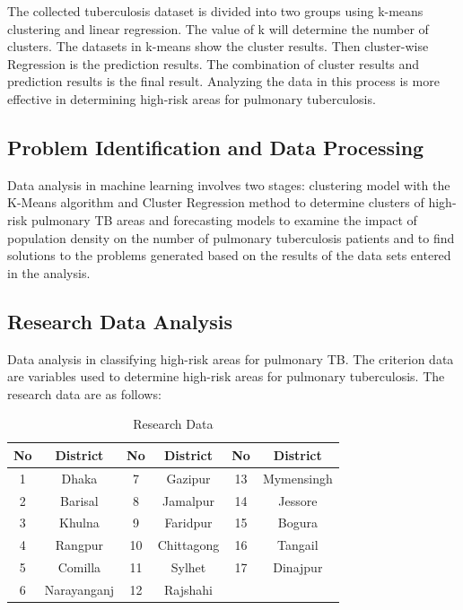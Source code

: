 \documentclass[conference]{IEEEtran}
\begin{document}
The collected tuberculosis dataset is divided into two groups using k-means clustering and linear regression.  The value of k will determine the number of clusters. The datasets in k-means show the cluster results.  Then cluster-wise Regression is the prediction results.  The combination of cluster results and prediction results is the final result.  Analyzing the data in this process is more effective in determining high-risk areas for pulmonary tuberculosis.

\subsection{Problem Identification and Data Processing}
Data analysis in machine learning involves two stages: clustering model with the K-Means algorithm and Cluster Regression method to determine clusters of high-risk pulmonary TB areas and forecasting models to examine the impact of population density on the number of pulmonary tuberculosis patients and to find solutions to the problems generated based on the results of the data sets entered in the analysis.

\subsection{Research Data Analysis}
Data analysis in classifying high-risk areas for pulmonary TB. The criterion data are variables used to determine high-risk areas for pulmonary tuberculosis. The research data are as follows:

\begin{table}[H]
    \centering
    \begin{tabular}{|c|c|c|c|c|c|}
    \hline
    \textbf{No} & \textbf{District} & \textbf{No} & \textbf{District} & \textbf{No} & \textbf{District} \\
    \hline
    1 & Dhaka & 7 & Gazipur & 13 & Mymensingh \\ \hline
    2 & Barisal & 8 & Jamalpur & 14 & Jessore \\ \hline
    3 & Khulna & 9 & Faridpur & 15 & Bogura \\ \hline
    4 & Rangpur & 10 & Chittagong & 16 & Tangail \\ \hline
    5 & Comilla & 11 & Sylhet & 17 & Dinajpur \\ \hline
    6 & Narayanganj & 12 & Rajshahi & & \\
    \hline
    \end{tabular}
    \caption{Research Data}
    \label{tab:research_data}
\end{table}
    
\end{document}
